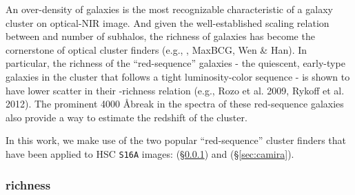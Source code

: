\documentclass[fleqn,usenatbib,useAMS,english]{mnras}
\begin{document}
    An over-density of galaxies is the most recognizable characteristic of a galaxy cluster on
    optical-NIR image.
    And given the well-established scaling relation between \mvir{} and number of subhalos,
    the richness of galaxies has become the cornerstone of optical cluster finders
    (e.g., \addref{}, MaxBCG, Wen \& Han).
    In particular, the richness of the ``red-sequence'' galaxies - the quiescent, early-type
    galaxies in the cluster that follows a tight luminosity-color sequence - is shown to have
    lower scatter in their \mvir{}-richness relation
    (e.g., \addref{} Rozo et al. 2009, Rykoff et al. 2012).
    The prominent 4000 \AA break in the spectra of these red-sequence galaxies also provide a
    way to estimate the redshift of the cluster.

    In this work, we make use of the two popular ``red-sequence'' cluster finders that have been
    applied to HSC \texttt{S16A} images: \redm{} (\S \ref{sec:redmapper}) and \camira{}
    (\S \ref{sec:camira}).

\subsubsection{\redm{} richness}
    \label{sec:redmapper}

\end{document}
